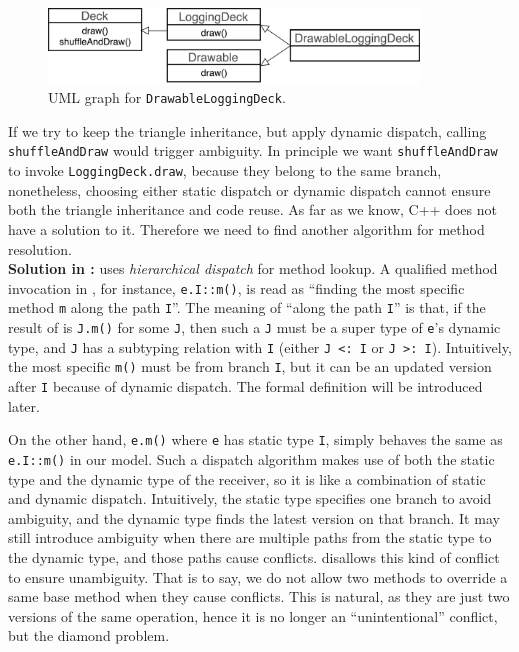 \begin{figure}[t]
	\centering
	\includegraphics[height=2cm]{pics/DrawableLoggingDeck.pdf}
	\caption{UML graph for \lstinline|DrawableLoggingDeck|.}\label{fig:drawableloggingdeck}
\end{figure}
If we try to keep the triangle inheritance, but apply dynamic dispatch, calling \lstinline|shuffleAndDraw| would trigger ambiguity. 
In principle we want \lstinline|shuffleAndDraw| to invoke \lstinline|LoggingDeck.draw|, because they belong to the same branch, 
nonetheless, choosing either static dispatch
or dynamic dispatch cannot ensure both the triangle inheritance and code reuse. As far as we know, C++ does not have a solution
to it. Therefore we need to find another algorithm for method resolution.\\

\noindent\textbf{Solution in \name{}:} \name{} uses \textit{hierarchical dispatch} for method lookup. A qualified
method invocation in \name{}, for instance, \lstinline|e.I::m()|, is read as
``finding the most specific method \lstinline|m| along the path
\lstinline|I|''. The meaning of ``along the path \lstinline|I|'' is
that, if the result of \dispatch{} is \lstinline|J.m()| for some \lstinline|J|, then such a \lstinline|J| must be a super type of \lstinline|e|'s dynamic type, and \lstinline|J| has a subtyping relation with \lstinline|I| (either \lstinline|J <: I| or \lstinline|J >: I|). Intuitively, the most specific \lstinline|m()| must be from branch \lstinline|I|, but it can be an updated version after \lstinline|I| because of dynamic dispatch. The formal definition will be introduced later.

On the other hand, \lstinline|e.m()| where \lstinline|e| has static type \lstinline|I|, simply behaves the same as \lstinline|e.I::m()| in our model. Such a dispatch algorithm makes use of both the static type and the dynamic type of the receiver, so it is like a combination of static and dynamic dispatch. Intuitively, the static type specifies one branch to avoid ambiguity, and the dynamic type finds the latest version on that branch. It may still introduce ambiguity when there are multiple paths from the static type to the dynamic type, and those paths cause conflicts. \name{} disallows this kind of conflict to ensure unambiguity. That is to say, we do not allow two methods to override a same base method when they cause conflicts. This is natural, as they are just two versions of the same operation, hence it is no longer an ``unintentional'' conflict, but the diamond problem.

